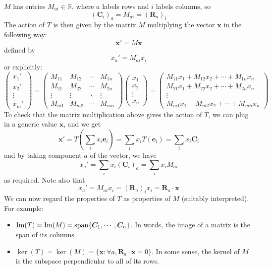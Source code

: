 \documentclass{article}
\begin{document}
	$M$ has entries $M_{ai} \in \mathbb R$, where $a$ labels rows and $i$ labels columns, so
	\[ (\bm C_i)_a = M_{ai} = (\bm R_a)_i \]
	The action of $T$ is then given by the matrix $M$ multiplying the vector $\bm x$ in the following way:
	\[ \bm x' = M \bm x \]
	defined by
	\[ x_a' = M_{ai}x_i \]
	or explicitly:
	\[
		\begin{pmatrix}
			x_1' \\ x_2' \\ \vdots \\ x_m'
		\end{pmatrix}
		=
		\begin{pmatrix}
			M_{11} & M_{12} & \cdots & M_{1n} \\
			M_{21} & M_{22} & \cdots & M_{2n} \\
			\vdots & \vdots & \ddots & \vdots \\
			M_{m1} & M_{m2} & \cdots & M_{mn}
		\end{pmatrix}
		\begin{pmatrix}
			x_1 \\ x_2 \\ \vdots \\ x_n
		\end{pmatrix}
		=
		\begin{pmatrix}
			M_{11} x_1 + M_{12} x_2 + \cdots + M_{1n} x_n \\
			M_{21} x_1 + M_{22} x_2 + \cdots + M_{2n} x_n \\
			\vdots \\
			M_{m1} x_1 + M_{m2} x_2 + \cdots + M_{mn} x_n
		\end{pmatrix}
	\]
	To check that the matrix multiplication above gives the action of $T$, we can plug in a generic value $\bm x$, and we get
	\[ \bm x' = T\left(\sum_i x_i \bm e_i\right) = \sum_i x_i T(\bm e_i) = \sum_i x_i \bm C_i \]
	and by taking component $a$ of the vector, we have
	\[ x_a' = \sum_i x_i (\bm C_i)_a = \sum_i x_i M_{ai} \]
	as required. Note also that
	\[ x_a' = M_{ai}x_i = (\bm R_a)_i x_i = \bm R_a \cdot \bm x \]
	We can now regard the properties of $T$ as properties of $M$ (suitably interpreted). For example:
	\begin{itemize}
		\item $\Im(T) = \Im(M) = \operatorname{span} \{ \bm C_1, \cdots, \bm C_n \}$. In words, the image of a matrix is the span of its columns.
		\item $\ker(T) = \ker(M) = \{ \bm x: \forall a, \bm R_a \cdot \bm x = 0 \}$. In some sense, the kernel of $M$ is the subspace perpendicular to all of its rows.
	\end{itemize}
\end{document}
